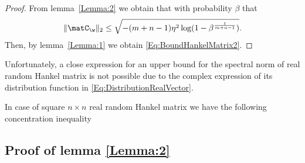 \begin{proof}
	From lemma~\ref{Lemma:2} we obtain that with probability $\beta$ that
	\[\|\matC_{\w}\|_2\le \sqrt{-(m+n-1)\eta^2\log(1-\beta^{\frac{1}{m+n-1}})}.\]
	Then, by lemma~\ref{Lemma:1} we obtain \eqref{Eq:BoundHankelMatrix2}.
\end{proof}

Unfortunately, a close expression for an upper bound for the spectral norm of real random Hankel matrix is not possible due to the complex expression of its distribution function in \eqref{Eq:DistributionRealVector}. 

In case of square $n\times n$ real random Hankel matrix we have the following concentration inequality  \cite[chap. 4]{tropp2015}


	\subsection{Proof of lemma \ref{Lemma:2}}\label{Proof:Lemma2}

